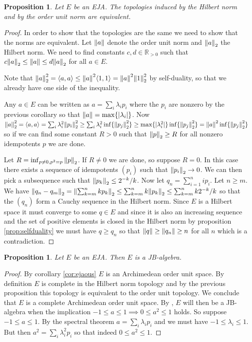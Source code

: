 \documentclass[submission,copyright,creativecommons]{eptcs}
\newcounter{main}
\newtheorem{proposition}[main]{Proposition}
\theoremstyle{definition}
\DeclarePairedDelimiter{\inn}{\langle}{\rangle}
\newcommand\R{\mathbb{R}}
\begin{document}
\begin{proposition}\label{prop:equivalenttopology}
    Let $E$ be an EJA. The topologies induced by the Hilbert norm and by the order unit norm are equivalent.
\end{proposition}
\begin{proof}
    In order to show that the topologies are the same we need to show that the norms are equivalent. Let $\norm{a}$ denote the order unit norm and $\norm{a}_2$ the Hilbert norm. We need to find constants $c,d\in \R_{>0}$ such that $c\norm{a}_2\leq \norm{a}\leq d\norm{a}_2$ for all $a\in E$.

    Note that $\norm{a}_2^2 = \inn{a,a}\leq \norm{a}^2 \inn{1,1} = \norm{a}^2\norm{1}_2^2$ by self-duality, so that we already have one side of the inequality.

    Any $a\in E$ can be written as $a=\sum_i \lambda_i p_i$ where the $p_i$ are nonzero by the previous corollary so that $\norm{a}=\max\{\lvert \lambda_i \rvert\}$. Now $\norm{a}_2^2 = \inn{a,a} = \sum_i \lambda_i^2 \norm{p_i}_2^2 \geq \sum_i \lambda_i^2 \inf\{\norm{p_j}_2^2\} \geq \max\{\lvert \lambda_i^2 \rvert\} \inf\{\norm{p_j}_2^2\} = \norm{a}^2 \inf\{\norm{p_j}_2^2\}$ so if we can find some constant $R>0$ such that $\norm{p}_2 \geq R$ for all nonzero idempotents $p$ we are done.

    Let $R=\inf_{p\neq 0, p^2=p} \norm{p}_2$. If $R\neq 0$ we are done, so suppose $R=0$. In this case there exists a sequence of idempotents $(p_i)$ such that $\norm{p_i}_2\rightarrow 0$. We can then pick a subsequence such that $\norm{p_k}_2 \leq 2^{-k}/k$. Now let $q_n = \sum_{i=1}^n ip_i$. Let $n\geq m$. We have $\norm{q_n - q_m}_2 = \norm{\sum_{k=m}^n k p_k}_2 \leq \sum_{k=m}^n k\norm{p_k}_2 \leq \sum_{k=m}^n k 2^{-k}/k$ so that the $(q_n)$ form a Cauchy sequence in the Hilbert norm. Since $E$ is a Hilbert space it must converge to some $q\in E$ and since it is also an increasing sequence and the set of positive elements is closed in the Hilbert norm by proposition \ref{prop:selfduality} we must have $q\geq q_n$ so that $\norm{q}\geq \norm{q_n} \geq n$ for all $n$ which is a contradiction.
\end{proof}

\begin{proposition}\label{prop:EJAisJB}
    Let $E$ be an EJA. Then $E$ is a JB-algebra.
\end{proposition}
\begin{proof}
    By corollary \ref{cor:ejaous} $E$ is an Archimedean order unit space. By definition $E$ is complete in the Hilbert norm topology and by the previous proposition this topology is equivalent to the order unit topology. We conclude that $E$ is a complete Archimedean order unit space. By \cite[Theorem 1.11]{alfsen2012geometry}, $E$ will then be a JB-algebra when the implication $-1\leq a\leq 1 \implies 0\leq a^2\leq 1$ holds. So suppose $-1\leq a\leq 1$. By the spectral theorem $a=\sum_i \lambda_i p_i$ and we must have $-1\leq \lambda_i \leq 1$. But then $a^2 = \sum_i \lambda_i^2 p_i$ so that indeed $0\leq a^2 \leq 1$.
\end{proof}
\end{document}
